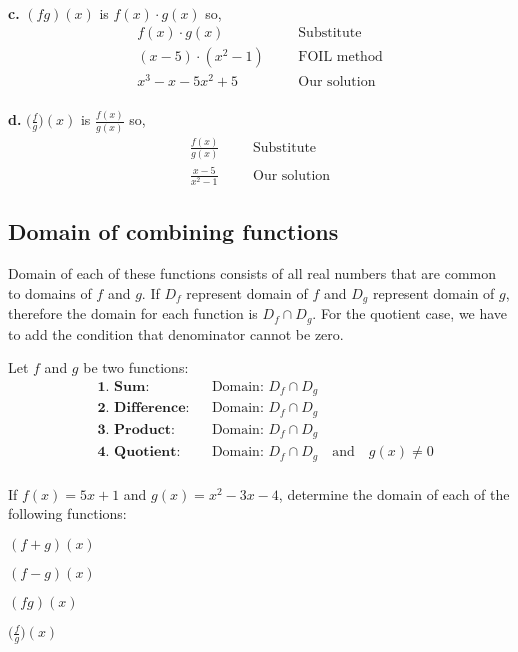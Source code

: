 \\[0.2cm]
\textbf{c. }
$(fg)(x)$ is $f(x)\cdot g(x)$ so,
\begin{align*}
    f(x)\cdot g(x)&   &   &\text{Substitute}\\
    (x-5)\cdot (x^2-1)&    &   &\text{FOIL method}\\
    x^3-x-5x^2+5&    &   &\text{Our solution}
\end{align*}
\\[0.2cm]
\textbf{d. }
$\biggl(\frac{f}{g} \biggr)(x)$ is $\frac{f(x)}{g(x)}$ so,
\begin{align*}
    \frac{f(x)}{g(x)}&   &   &\text{Substitute}\\
    \frac{x-5}{x^2-1}&    &   &\text{Our solution}
\end{align*}
\subsection{Domain of combining functions}
Domain of  each of these functions consists of all real numbers that are common to domains of $f$ and $g$. If $D_f$ represent domain of $f$ and $D_g$ represent domain of $g$, therefore the domain for each function is $D_f \cap D_g$. For the quotient case, we have to add the condition that denominator cannot be zero.
\begin{tcolorbox}[
                    title=Domain of combining functions, fonttitle=\bfseries,
                    colframe=blue!70!red,
                    colback=white]
Let $f$ and $g$ be two functions:
\begin{align*}
    &\textbf{1. Sum:} &     &\text{Domain: } D_f \cap D_g\\
    &\textbf{2. Difference:} &  &\text{Domain: } D_f \cap D_g\\
    &\textbf{3. Product:} & &\text{Domain: } D_f \cap D_g\\
    &\textbf{4. Quotient:} &    &\text{Domain: } D_f \cap D_g\quad  \text{and} \quad g(x)\neq 0\\
\end{align*}
\end{tcolorbox}
\begin{exa}
    If $f(x)=5x+1$ and $g(x)=x^2-3x-4$, determine the domain of each of the following functions:
        \begin{enumerate}[\bfseries a.]
    \begin{multicols}{2}
        \item $(f+g)(x)$
        \item $(f-g)(x)$
        \item $(fg)(x)$
        \item $\biggl(\frac{f}{g} \biggr)(x)$
    \end{multicols}
    \end{enumerate}
\end{exa}
